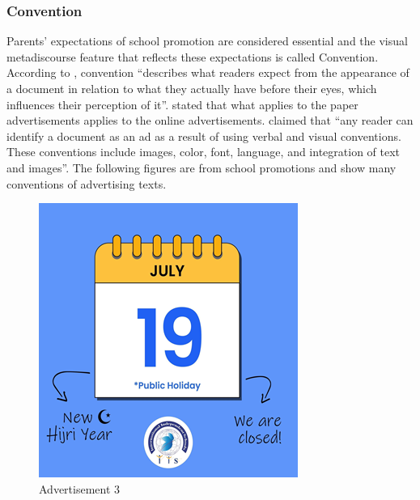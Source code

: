 \documentclass[english]{textolivre}
\begin{document}
\subsubsection{Convention}\label{sec-organizacao-latex}
Parents’ expectations of school promotion are considered essential and the visual metadiscourse feature that reflects these expectations is called Convention. According to \textcite[p.~97]{mancini_cinematic_2005}, convention “describes what readers expect from the appearance of a document in relation to what they actually have before their eyes, which influences their perception of it”. \textcite{kumpf_visual_2000} stated that what applies to the paper advertisements applies to the online advertisements. \textcite[p.~31]{al-subhi_metadiscourse_2022} claimed that “any reader can identify a document as an ad as a result of using verbal and visual conventions. These conventions include images, color, font, language, and integration of text and images”. The following figures are from school promotions and show many conventions of advertising texts.

\begin{figure}[htbp]
\centering
\begin{minipage}{0.5\textwidth}
\includegraphics[width=\linewidth]{Fig3.png}
\caption{Advertisement 3}
\label{fig3}
\end{minipage}
\end{figure}
\end{document}
